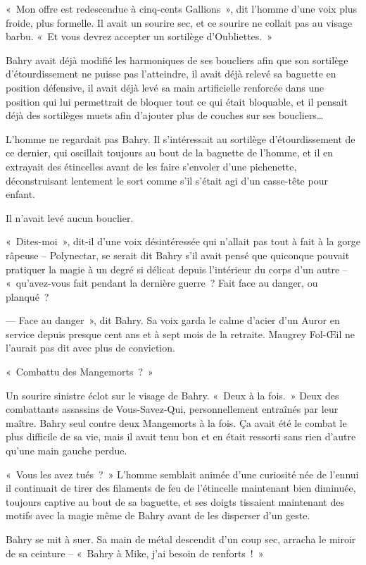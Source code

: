 «~Mon offre est redescendue à cinq-cents Gallions~», dit l'homme d'une voix plus froide, plus formelle.
Il avait un sourire sec, et ce sourire ne collait pas au visage barbu.
«~Et vous devrez accepter un sortilège d'Oubliettes.~»

Bahry avait déjà modifié les harmoniques de ses boucliers afin que son sortilège d'étourdissement ne puisse pas l'atteindre, il avait déjà relevé sa baguette en position défensive, il avait déjà levé sa main artificielle renforcée dans une position qui lui permettrait de bloquer tout ce qui était bloquable, et il pensait déjà des sortilèges muets afin d'ajouter plus de couches sur ses boucliers…

L'homme ne regardait pas Bahry.
Il s'intéressait au sortilège d'étourdissement de ce dernier, qui oscillait toujours au bout de la baguette de l'homme, et il en extrayait des étincelles avant de les faire s'envoler d'une pichenette, déconstruisant lentement le sort comme s'il s'était agi d'un casse-tête pour enfant.

Il n'avait levé aucun bouclier.

«~Dites-moi~», dit-il d'une voix désintéressée qui n'allait pas tout à fait à la gorge râpeuse -- Polynectar, se serait dit Bahry s'il avait pensé que quiconque pouvait pratiquer la magie à un degré si délicat depuis l'intérieur du corps d'un autre -- «~qu'avez-vous fait pendant la dernière guerre~?
Fait face au danger, ou planqué~?

--- Face au danger~», dit Bahry.
Sa voix garda le calme d'acier d'un Auror en service depuis presque cent ans et à sept mois de la retraite.
Maugrey Fol-Œil ne l'aurait pas dit avec plus de conviction.

«~Combattu des Mangemorts~?~»

Un sourire sinistre éclot sur le visage de Bahry.
«~Deux à la fois.~»
Deux des combattants assassins de Vous-Savez-Qui, personnellement entraînés par leur maître.
Bahry seul contre deux Mangemorts à la fois.
Ça avait été le combat le plus difficile de sa vie, mais il avait tenu bon et en était ressorti sans rien d'autre qu'une main gauche perdue.

«~Vous les avez tués~?~»
L'homme semblait animée d'une curiosité née de l'ennui il continuait de tirer des filaments de feu de l'étincelle maintenant bien diminuée, toujours captive au bout de sa baguette, et ses doigts tissaient maintenant des motifs avec la magie même de Bahry avant de les disperser d'un geste.

Bahry se mit à suer.
Sa main de métal descendit d'un coup sec, arracha le miroir de sa ceinture -- «~Bahry à Mike, j'ai besoin de renforts~!~»

